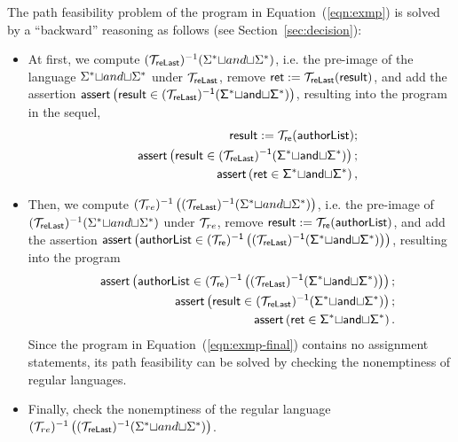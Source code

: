 The path feasibility problem of the program in Equation~(\ref{eqn:exmp}) is solved by a ``backward'' reasoning as follows (see Section~\ref{sec:decision}):  
\begin{itemize}
\item At first, we compute $(\mathcal{T}_{\sf reLast})^{-1}(\Sigma^*{\small\sqcup} and{\small\sqcup} \Sigma^*)$,  i.e. the pre-image of the language $\Sigma^*{\small\sqcup} and{\small\sqcup} \Sigma^*$ under $\mathcal{T}_{\sf reLast}$,  remove $\sf  ret : = \mathcal{T}_{reLast}(result)$, and add the assertion $\textsf{assert}\left(\sf result \in (\mathcal{T}_{\sf reLast})^{-1}(\Sigma^*{\small\sqcup} and{\small\sqcup} \Sigma^*)\right)$, resulting into the program in the sequel,
\begin{eqnarray}
& & \sf result  := \sf  \mathcal{T}_{ re}(authorList); \nonumber\\
& & \textsf{assert}\left(\sf result \in (\mathcal{T}_{\sf reLast})^{-1}(\Sigma^*{\small\sqcup} and{\small\sqcup} \Sigma^*)\right); \nonumber\\
& & \sf \textsf{assert}\left(ret \in \Sigma^*{\small\sqcup} and{\small\sqcup} \Sigma^*\right),
\end{eqnarray}

%
\item Then, we compute $(\mathcal{T}_{ re})^{-1}\left((\mathcal{T}_{\sf reLast})^{-1}(\Sigma^*{\small\sqcup} and{\small\sqcup} \Sigma^*)\right)$, i.e. the pre-image of $(\mathcal{T}_{\sf reLast})^{-1}(\Sigma^*{\small\sqcup} and{\small\sqcup} \Sigma^*)$ under $\mathcal{T}_{ re}$, remove $ \sf result  := \sf  \mathcal{T}_{ re}(authorList)$, and add the assertion $\textsf{assert}\left(\sf authorList \in (\mathcal{T}_{ re})^{-1}\left((\mathcal{T}_{\sf reLast})^{-1}(\Sigma^*{\small\sqcup} and{\small\sqcup} \Sigma^*)\right)\right)$, resulting into the program 
\begin{eqnarray}\label{eqn:exmp-final}
& & \textsf{assert}\left(\sf authorList \in (\mathcal{T}_{ re})^{-1}\left((\mathcal{T}_{\sf reLast})^{-1}(\Sigma^*{\small\sqcup} and{\small\sqcup} \Sigma^*)\right)\right); \nonumber\\
& & \textsf{assert}\left(\sf result \in (\mathcal{T}_{\sf reLast})^{-1}(\Sigma^*{\small\sqcup} and{\small\sqcup} \Sigma^*)\right); \nonumber\\
& & \sf \textsf{assert}\left(ret \in \Sigma^*{\small\sqcup} and{\small\sqcup} \Sigma^*\right).
\end{eqnarray}
Since the program in Equation~(\ref{eqn:exmp-final}) contains no assignment statements, its path feasibility can be solved by checking the nonemptiness of regular languages.
\item Finally, check the nonemptiness of the regular language $(\mathcal{T}_{ re})^{-1}\left((\mathcal{T}_{\sf reLast})^{-1}(\Sigma^*{\small\sqcup} and{\small\sqcup} \Sigma^*)\right)$.
\end{itemize}

